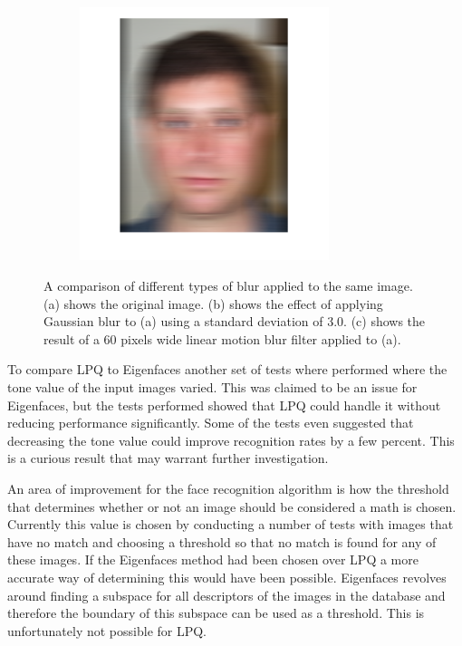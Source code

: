 \begin{figure}[H]
\begin{subfigure}{.30\textwidth}
  \includegraphics[width=0.8\textwidth]{img/blur_test/motion_img.png}
  \caption{}
\end{subfigure}%
\caption{A comparison of different types of blur applied to the same image. (a) shows the original image. (b) shows the effect of applying Gaussian blur to (a) using a standard deviation of 3.0. (c) shows the result of a 60 pixels wide linear motion blur filter applied to (a).}
\label{fig:fr_result_images}
\end{figure}

To compare LPQ to Eigenfaces another set of tests where performed where the tone value of the input images varied. This was claimed to be an issue for Eigenfaces, but the tests performed showed that LPQ could handle it without reducing performance significantly. Some of the tests even suggested that decreasing the tone value could improve recognition rates by a few percent. This is a curious result that may warrant further investigation.

An area of improvement for the face recognition algorithm is how the threshold that determines whether or not an image should be considered a math is chosen. Currently this value is chosen by conducting a number of tests with images that have no match and choosing a threshold so that no match is found for any of these images. If the Eigenfaces method had been chosen over LPQ a more accurate way of determining this would have been possible. Eigenfaces revolves around finding a subspace for all descriptors of the images in the database and therefore the boundary of this subspace can be used as a threshold. This is unfortunately not possible for LPQ.

